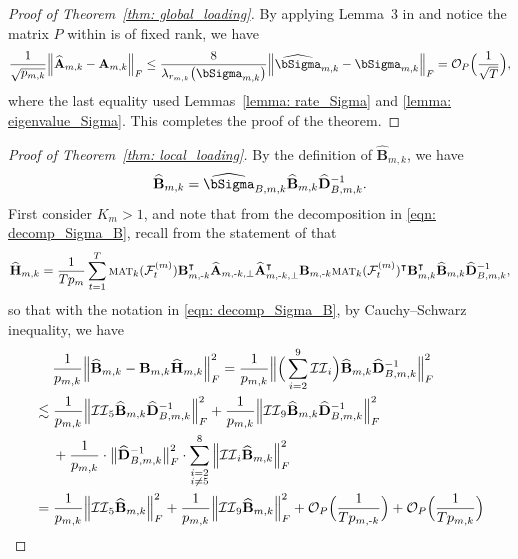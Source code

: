 \documentclass[aos]{imsart}
\theoremstyle{plain}
\theoremstyle{definition}
\def\mat{\textnormal{\textsc{mat}}}
\def\wh#1{\widehat{#1}}
\def\cF{\mathcal{F}}
\def\cII{\mathcal{II}}
\def\cO{\mathcal{O}}
\def\bA{\mathbf{A}}
\def\bB{\mathbf{B}}
\def\bD{\mathbf{D}}
\def\bH{\mathbf{H}}
\def\trans{\intercal}
\begin{document}
\begin{proof}[Proof of Theorem~\ref{thm: global_loading}]
By applying Lemma~3 in \cite{Lametal2011} and notice the matrix $P$ within is of fixed rank, we have
\begin{align*}
    \frac{1}{\sqrt{p_{m,k}}} \Big\| \wh{\bA}_{m,k} -\bA_{m,k} \Big\|_F \leq \frac{8}{\lambda_{r_{m,k}}\big( \bSigma_{m,k} \big)} \Big\| \wh\bSigma_{m,k} -\bSigma_{m,k} \Big\|_F
    = \cO_P\Big( \frac{1}{\sqrt{T}} \Big) ,
\end{align*}
where the last equality used Lemmas~\ref{lemma: rate_Sigma} and \ref{lemma: eigenvalue_Sigma}. This completes the proof of the theorem.
\end{proof}




\begin{proof}[Proof of Theorem~\ref{thm: local_loading}]
By the definition of $\wh{\bB}_{m,k}$, we have
\[
\wh{\bB}_{m,k} = \wh\bSigma_{B,m,k} \wh{\bB}_{m,k} \wh{\bD}_{B,m,k}^{-1} .
\]
First consider $K_m> 1$, and note that from the decomposition in \eqref{eqn: decomp_Sigma_B},
recall from the statement of  that
{\small
\[
\wh{\bH}_{m,k} = \frac{1}{Tp_m} \sum_{t=1}^T \mat_k(\cF_t^{(m)}) \bB_{m,\text{-}k}^\trans \wh{\bA}_{m,\text{-}k,\perp} \wh{\bA}_{m,\text{-}k,\perp}^\trans \bB_{m,\text{-}k} \mat_k(\cF_t^{(m)})^\trans \bB_{m,k}^\trans \wh{\bB}_{m,k} \wh{\bD}_{B,m,k}^{-1} ,
\]
}
so that with the notation in \eqref{eqn: decomp_Sigma_B}, by Cauchy--Schwarz inequality, we have
\begin{align}
    &\;\quad
    \frac{1}{p_{m,k}} \Big\| \wh{\bB}_{m,k} - \bB_{m,k} \wh{\bH}_{m,k} \Big\|_F^2 = \frac{1}{p_{m,k}} \Big\| \Big( \sum_{i=2}^9 \cII_i \Big) \wh{\bB}_{m,k} \wh{\bD}_{B,m,k}^{-1} \Big\|_F^2 \notag \\
    &\lesssim
    \frac{1}{p_{m,k}} \Big\| \cII_5 \wh{\bB}_{m,k} \wh{\bD}_{B,m,k}^{-1} \Big\|_F^2 + \frac{1}{p_{m,k}} \Big\| \cII_9 \wh{\bB}_{m,k} \wh{\bD}_{B,m,k}^{-1} \Big\|_F^2 \notag \\
    &\;\quad
    + \frac{1}{p_{m,k}}  \cdot \big\| \wh{\bD}_{B,m,k}^{-1} \big\|_F^2 \cdot \sum_{\substack{i=2\\ i\neq 5}}^8 \Big\| \cII_i \wh{\bB}_{m,k} \Big\|_F^2 \notag \\
    &=
    \frac{1}{p_{m,k}} \Big\| \cII_5 \wh{\bB}_{m,k} \Big\|_F^2 + \frac{1}{p_{m,k}} \Big\| \cII_9 \wh{\bB}_{m,k} \Big\|_F^2 + \cO_P\Big( \frac{1}{T p_{m,\text{-}k}} \Big) + \cO_P\Big( \frac{1}{T p_{m,k}} \Big) \notag \\

\end{align}
\end{proof}
\end{document}
